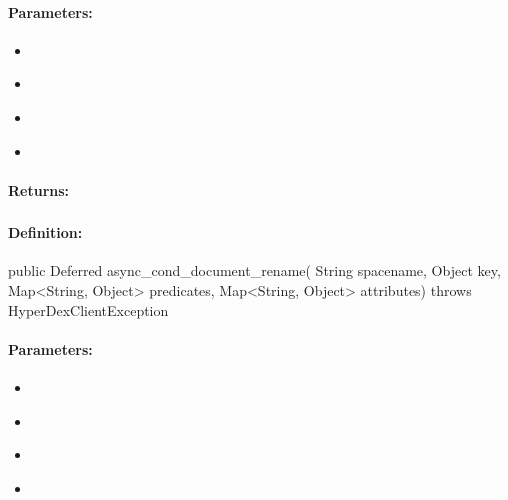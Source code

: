 \paragraph{Parameters:}
\begin{itemize}[noitemsep]
\item {}\\

\item {}\\

\item {}\\

\item {}\\

\end{itemize}

\paragraph{Returns:}


\pagebreak
\subsubsection{}
\label{api:java:async_cond_document_rename}


\paragraph{Definition:}
\begin{javacode}
public Deferred async_cond_document_rename(
        String spacename,
        Object key,
        Map<String, Object> predicates,
        Map<String, Object> attributes) throws HyperDexClientException
\end{javacode}

\paragraph{Parameters:}
\begin{itemize}[noitemsep]
\item {}\\

\item {}\\

\item {}\\

\item {}\\

\end{itemize}

